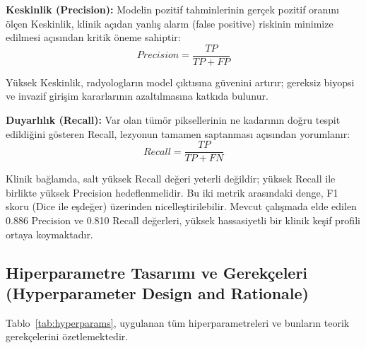 \documentclass[10pt,journal,compsoc]{IEEEtran}
\begin{document}
\textbf{Keskinlik (Precision):} Modelin pozitif tahminlerinin gerçek pozitif oranını ölçen Keskinlik, klinik açıdan yanlış alarm (false positive) riskinin minimize edilmesi açısından kritik öneme sahiptir:
\begin{equation}
Precision = \frac{TP}{TP + FP}
\end{equation}

Yüksek Keskinlik, radyologların model çıktısına güvenini artırır; gereksiz biyopsi ve invazif girişim kararlarının azaltılmasına katkıda bulunur.

\textbf{Duyarlılık (Recall):} Var olan tümör piksellerinin ne kadarının doğru tespit edildiğini gösteren Recall, lezyonun tamamen saptanması açısından yorumlanır:
\begin{equation}
Recall = \frac{TP}{TP + FN}
\end{equation}

Klinik bağlamda, salt yüksek Recall değeri yeterli değildir; yüksek Recall ile birlikte yüksek Precision hedeflenmelidir. Bu iki metrik arasındaki denge, F1 skoru (Dice ile eşdeğer) üzerinden nicelleştirilebilir. Mevcut çalışmada elde edilen 0.886 Precision ve 0.810 Recall değerleri, yüksek hassasiyetli bir klinik keşif profili ortaya koymaktadır.

\subsection{Hiperparametre Tasarımı ve Gerekçeleri \textnormal{\small{(Hyperparameter Design and Rationale)}}}

Tablo~\ref{tab:hyperparams}, uygulanan tüm hiperparametreleri ve bunların teorik gerekçelerini özetlemektedir.
\end{document}
